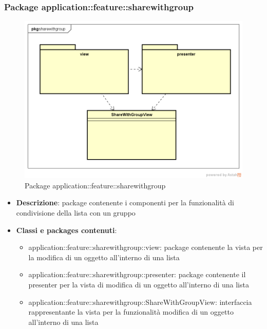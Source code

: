 \subsubsection{Package application::feature::sharewithgroup}
\label{Package application::feature::sharewithgroup}
\begin{figure}[H]
	\centering
	\includegraphics[scale=0.5]{Sezioni/Packages/Application/share_with_group.png}
	\caption{Package application::feature::sharewithgroup}
\end{figure}
\begin{itemize}
	\item \textbf{Descrizione}: package contenente i componenti per la funzionalità di condivisione della lista con un gruppo
	\item \textbf{Classi e packages contenuti}:
	\begin{itemize}
	\item application::feature::sharewithgroup::view: package contenente la vista per la modifica di un oggetto all'interno di una lista
	\item application::feature::sharewithgroup::presenter: package contenente il presenter per la vista di modifica di un oggetto all'interno di una lista
	\item application::feature::sharewithgroup::ShareWithGroupView: interfaccia rappresentante la vista per la funzionalità modifica di un oggetto all'interno di una lista
	\end{itemize}
\end{itemize}

